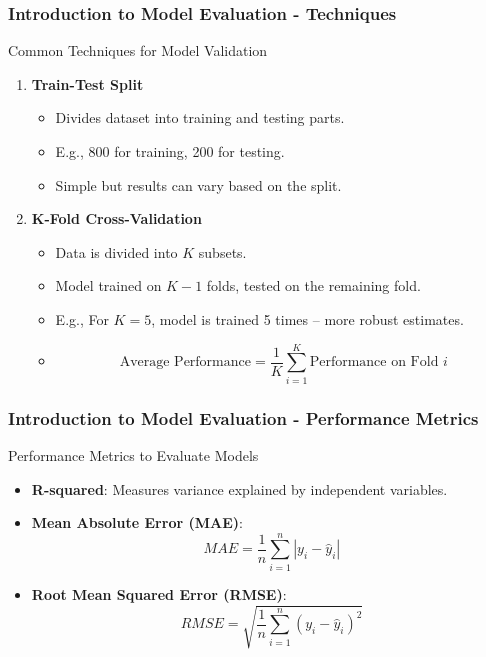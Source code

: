 \documentclass[aspectratio=169]{beamer}
\begin{document}
\begin{frame}[fragile]
    \frametitle{Introduction to Model Evaluation - Techniques}
    \begin{block}{Common Techniques for Model Validation}
        \begin{enumerate}
            \item \textbf{Train-Test Split}
                \begin{itemize}
                    \item Divides dataset into training and testing parts.
                    \item E.g., 800 for training, 200 for testing.
                    \item Simple but results can vary based on the split.
                \end{itemize}
                
            \item \textbf{K-Fold Cross-Validation}
                \begin{itemize}
                    \item Data is divided into \(K\) subsets. 
                    \item Model trained on \(K-1\) folds, tested on the remaining fold.
                    \item E.g., For \(K=5\), model is trained 5 times – more robust estimates.
                    \item \begin{equation}
                        \text{Average Performance} = \frac{1}{K} \sum_{i=1}^{K} \text{Performance on Fold } i
                    \end{equation}
                \end{itemize}
        \end{enumerate}
    \end{block}
\end{frame}

\begin{frame}[fragile]
    \frametitle{Introduction to Model Evaluation - Performance Metrics}
    \begin{block}{Performance Metrics to Evaluate Models}
        \begin{itemize}
            \item \textbf{R-squared}: Measures variance explained by independent variables.
            \item \textbf{Mean Absolute Error (MAE)}:
                \begin{equation}
                    MAE = \frac{1}{n} \sum_{i=1}^{n} |y_i - \hat{y}_i|
                \end{equation}
            \item \textbf{Root Mean Squared Error (RMSE)}:
                \begin{equation}
                    RMSE = \sqrt{\frac{1}{n} \sum_{i=1}^{n} (y_i - \hat{y}_i)^2}
                \end{equation}
        \end{itemize}
    \end{block}
\end{frame}
\end{document}
